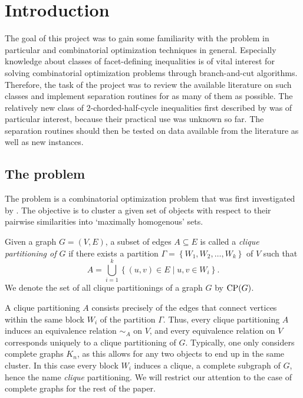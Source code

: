 \section{Introduction}
The goal of this project was to gain some familiarity with the \CP problem in particular and combinatorial optimization techniques in general.
Especially knowledge about classes of facet-defining inequalities is of vital interest for solving combinatorial optimization problems through branch-and-cut algorithms.
Therefore, the task of the project was to review the available literature on such classes and implement separation routines for as many of them as possible.
The relatively new class of $2$-chorded-half-cycle inequalities first described by \cite{andresPolyhedralStudyLifted2022} was of particular interest, because their practical use was unknown so far.
The separation routines should then be tested on data available from the literature as well as new instances.

\subsection{The \CP problem}\label{subsec:cp}
The \CP problem is a combinatorial optimization problem that was first investigated by \cite{grotschelFacetsCliquePartitioning1990}.
The objective is to cluster a given set of objects with respect to their pairwise similarities into ‘maximally homogenous’ sets.

\begin{definition}[\CP]\label{def:cp}
	Given a graph $G=(V,E)$, a subset of edges $A \subseteq E$ is called a \textit{clique partitioning of $G$} if there exists a partition $\Gamma = \left\{ W_1, W_2, \ldots, W_k \right\}$ of $V$ such that
	\[
		A = \bigcup_{i=1}^k \left\{ (u,v) \in E \mid u,v \in W_i \right\}.
	\]
We denote the set of all clique partitionings of a graph $G$ by $\operatorname{\text{CP}}(G)$.
\end{definition}
\begin{note}
A clique partitioning $A$ consists precisely of the edges that connect vertices within the same block $W_i$ of the partition $\Gamma$.
Thus, every clique partitioning $A$ induces an equivalence relation $\sim_A$ on $V$, and every equivalence relation on $V$ corresponds uniquely to a clique partitioning of $G$.
Typically, one only considers complete graphs $K_n$, as this allows for any two objects to end up in the same cluster.
In this case every block $W_i$ induces a clique, \ie a complete subgraph of $G$, hence the name \textit{clique} partitioning.
We will restrict our attention to the case of complete graphs for the rest of the paper.
\end{note}

